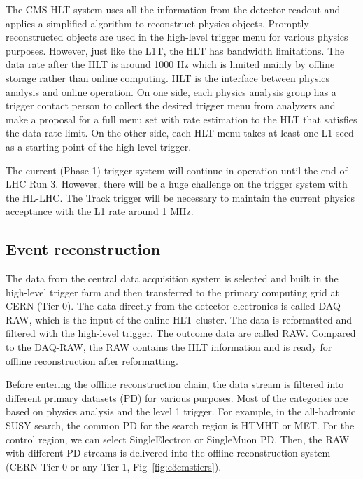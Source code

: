 The CMS HLT system uses all the information from the detector readout and applies a simplified algorithm to reconstruct physics objects. Promptly reconstructed objects are used in the high-level trigger menu for various physics purposes. However, just like the L1T, the HLT has bandwidth limitations. The data rate after the HLT is around 1000 Hz which is limited mainly by offline storage rather than online computing. HLT is the interface between physics analysis and online operation. On one side, each physics analysis group has a trigger contact person to collect the desired trigger menu from analyzers and make a proposal for a full menu set with rate estimation to the HLT that satisfies the data rate limit. On the other side, each HLT menu takes at least one L1 seed as a starting point of the high-level trigger.

The current (Phase 1) trigger system will continue in operation until the end of LHC Run 3. However, there will be a huge challenge on the trigger system with the HL-LHC. The Track trigger will be necessary to maintain the current physics acceptance with the L1 rate around 1 MHz. 

\subsection{Event reconstruction}

The data from the central data acquisition system is selected and built in the high-level trigger farm and then transferred to the primary computing grid at CERN (Tier-0). The data directly from the detector electronics is called DAQ-RAW, which is the input of the online HLT cluster. The data is reformatted and filtered with the high-level trigger. The outcome data are called RAW. Compared to the DAQ-RAW, the RAW contains the HLT information and is ready for offline reconstruction after reformatting. 

Before entering the offline reconstruction chain, the data stream is filtered into different primary datasets (PD) for various purposes. Most of the categories are based on physics analysis and the level 1 trigger. For example, in the all-hadronic SUSY search, the common PD for the search region is HTMHT or MET. For the control region, we can select SingleElectron or SingleMuon PD. Then, the RAW with different PD streams is delivered into the offline reconstruction system (CERN Tier-0 or any Tier-1, Fig~\ref{fig:c3cmstiers}). 

